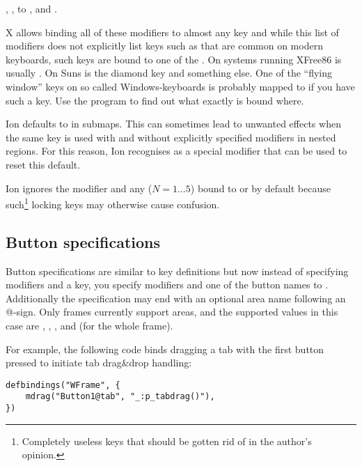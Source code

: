 , ,  to ,
 and .

X allows binding all of these modifiers to almost any key and while this
list of modifiers does not explicitly list keys such as 
 that are common on modern keyboards, such
keys are bound to one of the . On systems running XFree86
 is usually . On Suns  is the diamond key
and  something else. One of the ``flying window'' keys on so
called Windows-keyboards is probably mapped to  if you have
such a key. Use the program 
to find out what exactly is bound where. 

Ion defaults to  in submaps. This can sometimes lead to
unwanted effects when the same key is used with and without explicitly
specified modifiers in nested regions. For this reason, Ion recognises
 as a special modifier that can be used to reset this
default.

Ion ignores the  modifier and any  ($N=1{\ldots} 5$)
bound to  or
by default because such\footnote{Completely useless keys that should be
gotten rid of in the author's opinion.} locking keys may otherwise
cause confusion.


\subsection{Button specifications}

Button specifications are similar to key definitions but now
instead of specifying modifiers and a key, you specify modifiers
and one of the button names  to
. Additionally the
specification may end with an optional area name following an @-sign.
Only frames currently support areas, and the supported values in this
case are
, , ,  
and  (for the whole frame).

For example, the following code binds dragging a tab with the first 
button pressed to initiate tab drag\&drop handling:

\begin{verbatim}
defbindings("WFrame", {
    mdrag("Button1@tab", "_:p_tabdrag()"),
})
\end{verbatim}


